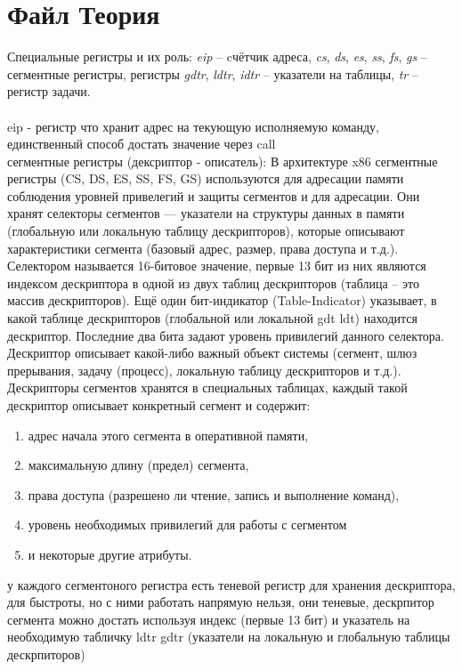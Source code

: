 \documentclass[a4paper,10pt]{article}
\begin{document}
\section*{Файл Теория}
Специальные регистры и их роль:
\textit{eip} -- cчётчик адреса, \textit{cs}, \textit{ds}, \textit{es}, \textit{ss}, \textit{fs}, \textit{gs} -- сегментные регистры,
регистры \textit{gdtr}, \textit{ldtr}, \textit{idtr} -- указатели на таблицы, \textit{tr} -- регистр задачи. \\
\vspace{0.5cm} \\
eip - регистр что хранит адрес на текующую исполняемую команду, единственный способ достать значение через call
\vspace{0.5cm} \\
сегментные регистры (дексриптор - описатель):
В архитектуре x86 сегментные регистры (CS, DS, ES, SS, FS, GS) используются для адресации памяти соблюдения уровней привелегий и защиты сегментов и для адресации. Они хранят селекторы сегментов — указатели на структуры данных в памяти (глобальную или локальную таблицу дескрипторов), которые описывают характеристики сегмента (базовый адрес, размер, права доступа и т.д.).
Селектором называется 16-битовое значение, первые 13 бит из них являются индексом дескриптора в одной из двух таблиц дескрипторов (таблица – это массив дескрипторов). Ещё один бит-индикатор (Table-Indicator) указывает, в какой таблице дескрипторов (глобальной или локальной gdt ldt)
находится дескриптор. Последние два бита задают уровень привилегий данного селектора. Дескриптор описывает какой-либо важный объект системы (сегмент, шлюз
прерывания, задачу (процесс), локальную таблицу дескрипторов и т.д.). \\
Дескрипторы сегментов хранятся в специальных таблицах, каждый такой дескриптор описывает
конкретный сегмент и содержит:
\begin{enumerate}
    \item адрес начала этого сегмента в оперативной памяти,
    \item максимальную длину (предел) сегмента,
    \item права доступа (разрешено ли чтение, запись и выполнение команд),
    \item уровень необходимых привилегий для работы с сегментом
    \item и некоторые другие атрибуты.
\end{enumerate}
у каждого сегментоного регистра есть теневой регистр для хранения дескриптора, для быстроты, но с ними работать напрямую нельзя, они теневые, дескрпитор сегмента можно достать используя индекс (первые 13 бит) и указатель на необходимую табличку ldtr gdtr (указатели на локальную и глобальную таблицы дескрпиторов) \\
\end{document}
